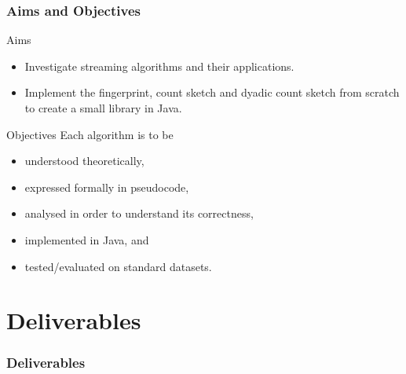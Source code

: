 \documentclass{beamer}
\begin{document}
\begin{frame}
  \frametitle{Aims and Objectives}

  \begin{block}{Aims}
    \begin{itemize}
      \item Investigate streaming algorithms and their applications.
      \item Implement the \alert{fingerprint}, \alert{count sketch} and \alert{dyadic count sketch} from scratch to create a small library in Java.
    \end{itemize}
  \end{block}

  \begin{block}{Objectives}
    Each algorithm is to be
    \begin{itemize}
      \item understood theoretically,
      \item expressed formally in pseudocode,
      \item analysed in order to understand its correctness,
      \item implemented in Java, and
      \item tested/evaluated on standard datasets.
    \end{itemize}
  \end{block}
\end{frame}

\section{Deliverables}

\begin{frame}
  \frametitle{Deliverables}

  \begin{center}
    \scalebox{0.5}{}
  \end{center}
\end{frame}
\end{document}

